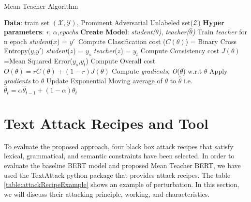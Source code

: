 \documentclass[%
	BCOR=8mm, %
	DIV=12,
	toc=bibliography, %
	toc=listof, %
	oneside, %
	egregdoesnotlikesansseriftitles, %
	]{scrbook}
\begin{document}
\begin{algorithm}[H]
    \caption{Mean Teacher Algorithm} \label{alg:MeanTeacher}
    \begin{algorithmic}
        \STATE \textbf{Data}: train set $\mathcal{(X,Y)}$,  Prominent Adversarial Unlabeled set($\mathcal{Z}$)
        \STATE \textbf{Hyper parameters}: \emph{r}, \emph{$\alpha$},\emph{epochs}
        \STATE \textbf{Create Model}: \emph{student($\theta$)}, \emph{teacher($\hat\theta$)} 
        \STATE  Train \emph{teacher} for n epoch
        \STATE  \emph{student}($x$) = $y'$\
        \STATE Compute Classification cost ($C(\theta)$) = Binary Cross Entropy($y$,$y')$
        \STATE  \emph{student}($z$) = $y_s$
        \STATE  \emph{teacher}($z$) = $y_t$
        \STATE Compute Consistency cost $J(\theta)$=Mean Squared Error($y_s$,$y_{t}$)
        \STATE Compute Overall cost  $\textit{O}(\theta)= r C(\theta)+(1-r)J(\theta)$
        \STATE Compute \emph{gradients}, \textit{O}($\theta$) w.r.t  $\theta$ 
        \STATE Apply \emph{gradients} to $\theta$
        \STATE Update Exponential Moving average of $\theta$ to $\hat\theta$ i.e. $\hat\theta_t= \alpha\hat\theta_{t-1}+(1-\alpha)\theta_t$\
        \ENDWHILE
        \ENDFOR
    \end{algorithmic}
\end{algorithm}

\section{Text Attack Recipes and Tool}
\label{section:attackrecipes}
To evaluate the proposed approach, four black box attack recipes that satisfy lexical, grammatical, and semantic constraints have been selected. In order to evaluate the baseline BERT model and proposed Mean Teacher BERT, we have used the TextAttack python package\cite{morris_textattack_2020}  that provides attack recipes. The table \ref{table:attackRecipeExample} shows an example of perturbation. In this section, we will discuss their attacking principle, working, and characteristics.
\end{document}
